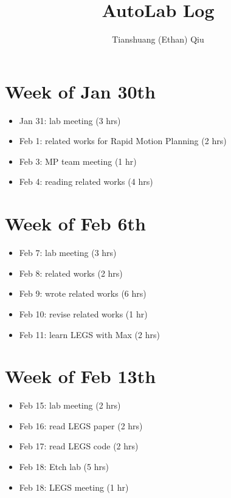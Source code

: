 \documentclass[12pt]{article}
\author{Tianshuang (Ethan) Qiu}
\begin{document}
\title{AutoLab Log}
\maketitle

\section{Week of Jan 30th}
\begin{itemize}
    \item Jan 31: lab meeting (3 hrs)
    \item Feb 1: related works for Rapid Motion Planning (2 hrs)
    \item Feb 3: MP team meeting (1 hr)
    \item Feb 4: reading related works (4 hrs)
\end{itemize}


\section{Week of Feb 6th}
\begin{itemize}
    \item Feb 7: lab meeting (3 hrs)
    \item Feb 8: related works (2 hrs)
    \item Feb 9: wrote related works (6 hrs)
    \item Feb 10: revise related works (1 hr)
    \item Feb 11: learn LEGS with Max (2 hrs)
\end{itemize}


\section{Week of Feb 13th}
\begin{itemize}
    \item Feb 15: lab meeting (2 hrs)
    \item Feb 16: read LEGS paper (2 hrs)
    \item Feb 17: read LEGS code (2 hrs)
    \item Feb 18: Etch lab (5 hrs)
    \item Feb 18: LEGS meeting (1 hr)
\end{itemize}
\end{document}
